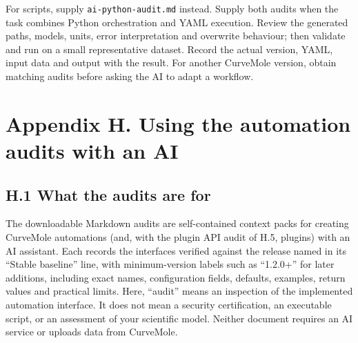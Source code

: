 \documentclass[
  10pt,
  a4paper,
  oneside]{scrreprt}
\begin{document}
For scripts, supply \texttt{ai-python-audit.md} instead. Supply both
audits when the task combines Python orchestration and YAML execution.
Review the generated paths, models, units, error interpretation and
overwrite behaviour; then validate and run on a small representative
dataset. Record the actual version, YAML, input data and output with the
result. For another CurveMole version, obtain matching audits before
asking the AI to adapt a workflow.

\hypertarget{appendix-h.-using-the-automation-audits-with-an-ai}{%
\chapter{Appendix H. Using the automation audits with an
AI}\label{appendix-h.-using-the-automation-audits-with-an-ai}}

\hypertarget{h.1-what-the-audits-are-for}{%
\section{H.1 What the audits are
for}\label{h.1-what-the-audits-are-for}}

The downloadable Markdown audits are self-contained context packs for
creating CurveMole automations (and, with the plugin API audit of H.5,
plugins) with an AI assistant. Each records the interfaces verified
against the release named in its ``Stable baseline'' line, with
minimum-version labels such as ``1.2.0+'' for later additions, including
exact names, configuration fields, defaults, examples, return values and
practical limits. Here, ``audit'' means an inspection of the implemented
automation interface. It does not mean a security certification, an
executable script, or an assessment of your scientific model. Neither
document requires an AI service or uploads data from CurveMole.
\end{document}
